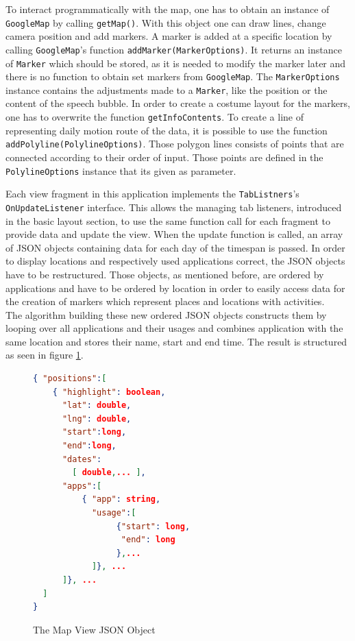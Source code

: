 To  interact programmatically with the map, one has to obtain an instance of \lstinline$GoogleMap$ by calling \lstinline$getMap()$. With this object one can draw lines, change camera position and add markers. A marker is added at a specific location by calling \lstinline$GoogleMap$'s function \lstinline$addMarker(MarkerOptions)$. It returns an instance of \lstinline$Marker$ which should be stored, as it is needed to modify the marker later and there is no function to obtain set markers from \lstinline$GoogleMap$. The \lstinline$MarkerOptions$ instance contains the adjustments made to a \lstinline$Marker$, like the position or the content of the speech bubble. In order to create a costume layout for the markers, one has to overwrite the function \lstinline$getInfoContents$. To create a line of representing daily motion route of the data, it is possible to use the function \lstinline$addPolyline(PolylineOptions)$. Those polygon lines consists of points that are connected according to their order of input. Those points are defined in the \lstinline$PolylineOptions$ instance that its given as parameter.

Each  view fragment in this application implements the \lstinline$TabListners$'s \lstinline$OnUpdateListener$ interface. This allows the managing tab listeners, introduced in the basic layout section, to use the same function call for each fragment to provide data and update the view.
When the update function is called, an array of JSON objects containing data for each day of the timespan is passed. In order to display locations and respectively used applications correct, the JSON objects have to be restructured. Those objects, as mentioned before, are ordered by applications and have to be ordered by location in order to easily access data for the creation of markers which represent places and locations with activities.\\
The algorithm building these new ordered JSON objects constructs them by looping over all applications and their usages and combines application with the same location and stores their name, start and end time. The result is structured as seen in figure \ref{fig:mapsectionjson}.
\begin{figure}
\caption{The Map View JSON Object}
\label{fig:mapsectionjson}
\begin{lstlisting}[language=json,firstnumber=1]
{ "positions":[
    { "highlight": boolean,
      "lat": double,
      "lng": double,
      "start":long,
      "end":long,
      "dates":
        [ double,... ],
      "apps":[
          { "app": string,
            "usage":[
                 {"start": long,
                  "end": long
                 },...
            ]}, ...
      ]}, ...
  ]
}
\end{lstlisting}
\end{figure}

